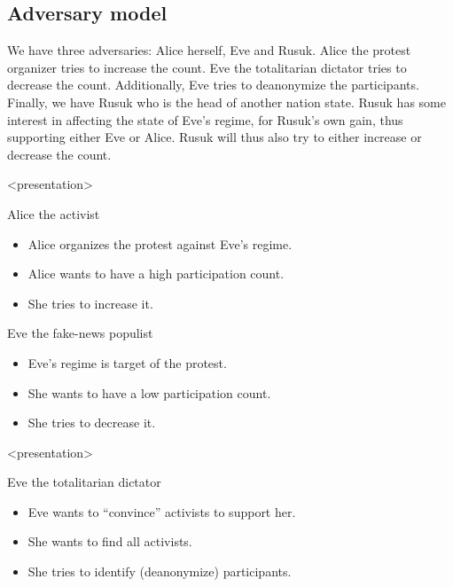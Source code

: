 \subsection{Adversary model}

We have three adversaries: Alice herself, Eve and Rusuk.
Alice the protest organizer tries to increase the count.
Eve the totalitarian dictator tries to decrease the count.
Additionally, Eve tries to deanonymize the participants.
Finally, we have Rusuk who is the head of another nation state.
Rusuk has some interest in affecting the state of Eve's regime, for Rusuk's own 
gain, thus supporting either Eve or Alice.
Rusuk will thus also try to either increase or decrease the count.

\begin{frame}<presentation>
  \begin{block}{Alice the activist}
    \begin{itemize}
      \item Alice organizes the protest against Eve's regime.
      \item Alice wants to have a high participation count.
      \item She tries to increase it.
    \end{itemize}
  \end{block}

  \pause

  \begin{block}{Eve the fake-news populist}
    \begin{itemize}
      \item Eve's regime is target of the protest.
      \item She wants to have a low participation count.
      \item She tries to decrease it.
    \end{itemize}
  \end{block}
\end{frame}

\begin{frame}<presentation>
  \begin{block}{Eve the totalitarian dictator}
    \begin{itemize}
      \item Eve wants to \enquote{convince} activists to support her.
      \item She wants to find all activists.
      \item She tries to identify (deanonymize) participants.
    \end{itemize}
  \end{block}
\end{frame}

